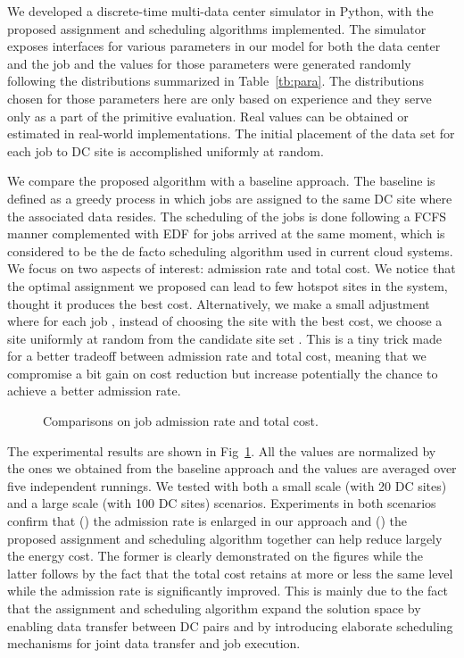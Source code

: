 \documentclass{article}
\begin{document}
We developed a discrete-time multi-data center simulator in Python, with the proposed assignment and scheduling algorithms implemented. The simulator exposes interfaces for various parameters in our model for both the data center and the job and the values for those parameters were generated randomly following the distributions summarized in Table~\ref{tb:para}. The distributions chosen for those parameters here are only based on experience and they serve only as a part of the primitive evaluation. Real values can be obtained or estimated in real-world implementations. The initial placement of the data set for each job to DC site is accomplished uniformly at random. 

We compare the proposed algorithm with a baseline approach. The baseline is defined as a greedy process in which jobs are assigned to the same DC site where the associated data resides. The scheduling of the jobs is done following a FCFS manner complemented with EDF for jobs arrived at the same moment, which is considered to be the de facto scheduling algorithm used in current cloud systems. We focus on two aspects of interest: admission rate and total cost. We notice that the optimal assignment we proposed can lead to few hotspot sites in the system, thought it produces the best cost. Alternatively, we make a small adjustment where for each job , instead of choosing the site with the best cost, we choose a site uniformly at random from the candidate site set . This is a tiny trick made for a better tradeoff between admission rate and total cost, meaning that we compromise a bit gain on cost reduction but increase potentially the chance to achieve a better admission rate.

\begin{figure}[t!]
    \centering
    \hspace{0.7cm}
    \caption{\label{fig:results}Comparisons on job admission rate and total cost.}
\end{figure}


The experimental results are shown in Fig~\ref{fig:results}. All the values are normalized by the ones we obtained from the baseline approach and the values are averaged over five independent runnings. We tested with both a small scale (with 20 DC sites) and a large scale (with 100 DC sites) scenarios.  Experiments in both scenarios confirm that () the admission rate is enlarged in our approach and () the proposed assignment and scheduling algorithm together can help reduce largely the energy cost. The former is clearly demonstrated on the figures while the latter follows by the fact that the total cost retains at more or less the same level while the admission rate is significantly improved. This is mainly due to the fact that the assignment and scheduling algorithm expand the solution space by enabling data transfer between DC pairs and by introducing elaborate scheduling mechanisms for joint data transfer and job execution.
\end{document}
